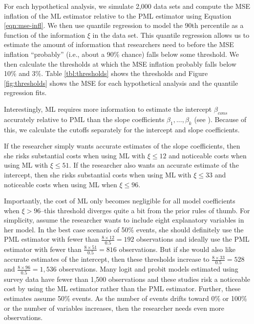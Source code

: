 \documentclass[12pt]{article}
\begin{document}
For each hypothetical analysis, we simulate 2,000 data sets and compute the MSE inflation of the ML estimator relative to the PML estimator using Equation \ref{eqn:mse-infl}.
We then use quantile regression to model the 90th percentile as a function of the information $\xi$ in the data set.
This quantile regression allows us to estimate the amount of information that researchers need to before the MSE inflation ``probably'' (i.e., about a 90\% chance) falls below some threshold.
We then calculate the thresholds at which the MSE inflation probably falls below 10\% and 3\%. Table \ref{tbl:thresholds} shows the thresholds and Figure \ref{fig:thresholds} shows the MSE for each hypothetical analysis and the quantile regression fits.

Interestingly, ML requires more information to estimate the intercept $\beta_{cons}$ accurately relative to PML than the slope coefficients $\beta_1,..., \beta_k$ (see \citealt{KingZeng2001}).
Because of this, we calculate the cutoffs separately for the intercept and slope coefficients.

If the researcher simply wants accurate estimates of the slope coefficients, then she risks substantial costs when using ML with $\xi \leq 12$ and noticeable costs when using ML with $\xi \leq 51$. If the researcher also wants an accurate estimate of the intercept, then she risks substantial costs when using ML with $\xi \leq 33$ and noticeable costs when using ML when $\xi \leq 96$. 

Importantly, the cost of ML only becomes negligible for all model coefficients when $\xi > 96$--this threshold diverges quite a bit from the prior rules of thumb.
For simplicity, assume the researcher wants to include eight explanatory variables in her model.
In the best case scenario of 50\% events, she should definitely use the PML estimator with fewer than $\frac{8 \times 12}{0.5} = 192$ observations and ideally use the PML estimator with fewer than $\frac{8 \times 51}{0.5} = 816$ observations.  
But if she would also like accurate estimates of the intercept, then these thresholds increase to $\frac{8 \times 33}{0.5} = 528$ and $\frac{8 \times 96}{0.5} = 1,536$ observations. 
Many logit and probit models estimated using survey data have fewer than 1,500 observations and these studies risk a noticeable cost by using the ML estimator rather than the PML estimator.
Further, these estimates assume 50\% events. 
As the number of events drifts toward 0\% or 100\% or the number of variables increases, then the researcher needs even more observations.
\end{document}

